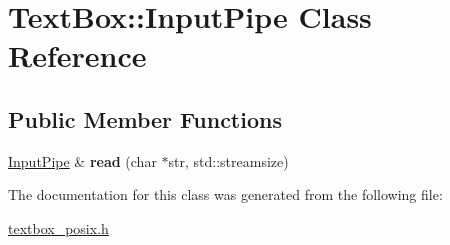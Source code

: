 \hypertarget{a00044}{}\section{Text\+Box\+:\+:Input\+Pipe Class Reference}
\label{a00044}
\subsection*{Public Member Functions}
\begin{DoxyCompactItemize}
\item 
\mbox{\label{a00044_a8db53b6915fad69a7415a4cb2b314e71}} 
\hyperlink{a00044}{Input\+Pipe} \& {\bfseries read} (char $\ast$str, std\+::streamsize)
\end{DoxyCompactItemize}


The documentation for this class was generated from the following file\+:\begin{DoxyCompactItemize}
\item 
\hyperlink{a00008}{textbox\+\_\+posix.\+h}\end{DoxyCompactItemize}
